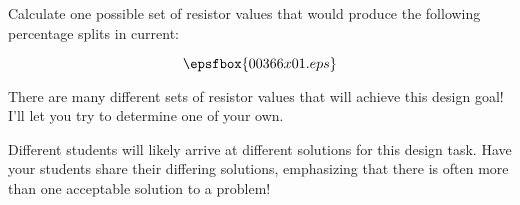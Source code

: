 

Calculate one possible set of resistor values that would produce the following percentage splits in current:

$$\epsfbox{00366x01.eps}$$







There are many different sets of resistor values that will achieve this design goal!  I'll let you try to determine one of your own.







Different students will likely arrive at different solutions for this design task.  Have your students share their differing solutions, emphasizing that there is often more than one acceptable solution to a problem!




